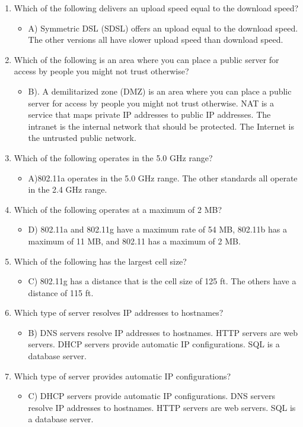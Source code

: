 \documentclass{article}
\begin{document}
\begin{enumerate}
\begin{itemize}
    \end{itemize}
    \item Which of the following delivers an upload speed equal to the download speed?
     \begin{itemize}
        \item A) Symmetric DSL (SDSL) offers an upload equal to the download speed. The other
versions all have slower upload speed than download speed. 
    \end{itemize}
    \item Which of the following is an area where you can place a public server for access by people
you might not trust otherwise?
     \begin{itemize}
        \item B). A demilitarized zone (DMZ) is an area where you can place a public server for access
by people you might not trust otherwise. NAT is a service that maps private IP addresses
to public IP addresses. The intranet is the internal network that should be protected. The
Internet is the untrusted public network.
    \end{itemize}
    \item Which of the following operates in the 5.0 GHz range?
     \begin{itemize}
        \item A)802.11a operates in the 5.0 GHz range. The other standards all operate in the 2.4 GHz
range.
    \end{itemize}
    \item Which of the following operates at a maximum of 2 MB?
     \begin{itemize}
        \item D) 802.11a and 802.11g have a maximum rate of 54 MB, 802.11b has a maximum of 11 MB,
and 802.11 has a maximum of 2 MB.
    \end{itemize}
    \item Which of the following has the largest cell size?
     \begin{itemize}
        \item C) 802.11g has a distance that is the cell size of 125 ft. The others have a distance of 115 ft.
    \end{itemize}
    \item Which type of server resolves IP addresses to hostnames?
     \begin{itemize}
        \item B) DNS servers resolve IP addresses to hostnames. HTTP servers are web servers. DHCP
servers provide automatic IP configurations. SQL is a database server.
    \end{itemize}
    \item Which type of server provides automatic IP configurations?
     \begin{itemize}
        \item C) DHCP servers provide automatic IP configurations. DNS servers resolve IP addresses to
hostnames. HTTP servers are web servers. SQL is a database server.
    \end{itemize}
    

\end{enumerate}
\end{document}
